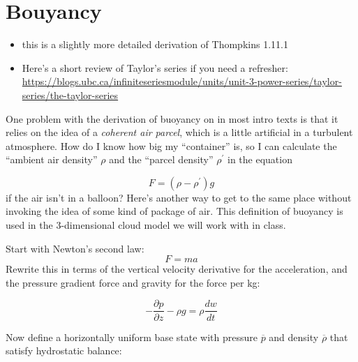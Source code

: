 \documentclass[12pt]{article}
\begin{document}
\newcommand{\vect}[1]{\boldsymbol{\vec{#1}}}
\pagestyle{first}


\section{Bouyancy}
\label{sec:bouyancy}




\begin{itemize}
\item this is a slightly more detailed derivation of Thompkins 1.11.1
\item Here's a short review of Taylor's series if you need a refresher: \href{https://blogs.ubc.ca/infiniteseriesmodule/units/unit-3-power-series/taylor-series/the-taylor-series}{https://blogs.ubc.ca/infiniteseriesmodule/units/unit-3-power-series/taylor-series/the-taylor-series}
\end{itemize}



One problem with the derivation of buoyancy on in most intro texts is
that it relies on the idea of a \textit{coherent air parcel}, which is a
little artificial in a turbulent atmosphere.  How do I know how big
my ``container'' is, so I can calculate the ``ambient air density'' $\rho$
and the ``parcel density'' $\rho^\prime$ in the equation

\begin{equation}
  \label{eq:container}
  F = \left (\rho - \rho^\prime \right ) g
\end{equation}
if the air isn't in a balloon? Here's another way to get to the same place
without invoking the idea of some kind of package of air.  This definition of buoyancy is
used in the 3-dimensional cloud model we will work with in class.

Start with Newton's second law:
\begin{equation}
  \label{eq:newton}
F= ma
\end{equation}
Rewrite this in terms of the vertical velocity derivative for the acceleration, 
and the pressure gradient force and gravity for the force per kg:

\begin{equation}
  \label{eq:newton2}
 - \frac{\partial p}{\partial z} - \rho g = \rho \frac{dw}{dt}
\end{equation}


Now define a horizontally uniform base state with pressure $\overline{p}$ and density
$\overline{\rho}$ that satisfy hydrostatic balance:
\end{document}
